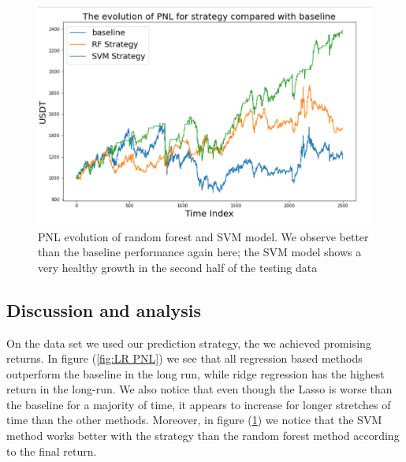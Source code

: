 \documentclass[twoside]{report}
\begin{document}
\begin{spacing}{1}
\begin{figure}
    \centering
    \includegraphics[scale = 0.6]{Images/PNL SVM RF.png}
    \caption{PNL evolution of random forest and SVM model. We observe better than the baseline performance again here; the SVM model shows a very healthy growth in the second half of the testing data}
    \label{fig:SVMRF PNL}
\end{figure}




\subsection{Discussion and analysis}
On the data set we used our prediction strategy, the we achieved promising returns. In figure (\ref{fig:LR PNL}) we see that all regression based methods outperform the baseline in the long run, while ridge regression has the highest return in the long-run. We also notice that even though the Lasso is worse than the baseline for a majority of time, it appears to increase for longer stretches of time than the other methods. Moreover, in figure (\ref{fig:SVMRF PNL}) we notice that the SVM method works better with the strategy than the random forest method according to the final return.\\


\end{spacing}
\end{document}
